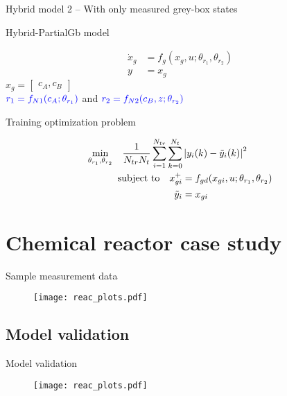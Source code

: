 \documentclass[xcolor=dvipsnames, 8pt]{beamer} %
\begin{document}
\begin{frame}{Hybrid model 2 -- With only measured grey-box states}


\begin{block}{Hybrid-PartialGb model}
	
	\begin{align*}
		\dot{x}_{g} &= f_g(x_g, u;\theta_{r_1}, \theta_{r_2}) \\ 
		y &= x_g
	\end{align*}
	$x_g = \begin{bmatrix} c_A, c_B\end{bmatrix}$ \\
	$\textcolor{blue}{r_1 = f_{N1}(c_A;\theta_{r_1})}$ and 
	$\textcolor{blue}{r_2 = f_{N2}(c_B, z;\theta_{r_2})}$
\end{block}

\pause
\begin{block}{Training optimization problem}
	
	\begin{align*}
		\underset{\theta_{r_1}, 
			\theta_{r_2}}{\textnormal{min}} \quad 
		\dfrac{1}{N_{tr} 
			N_t} \sum_{i=1}^{N_{tr}}
		\sum_{k=0}^{N_t} & \left| y_i(k) - \tilde{y}_i(k) \right|^2 \\ 
		\textnormal{subject to} \quad x_{gi}^+ & = f_{gd}(x_{gi}, 
		u;\theta_{r_1}, 
		\theta_{r_2}) \\
		\tilde{y}_i &= x_{gi} \\ 
	\end{align*}
\end{block}

\end{frame}

\section{Chemical reactor case study}
\begin{frame}{Sample measurement data}

\begin{figure}
	\centering
	\texttt{[image: reac\_plots.pdf]}
\end{figure}

\end{frame}

\subsection{Model validation}
\begin{frame}{Model validation}

\begin{figure}
	\centering
	\texttt{[image: reac\_plots.pdf]}
\end{figure}

\end{frame}
\end{document}
